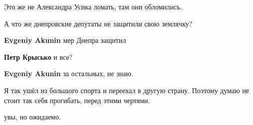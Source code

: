 \begin{itemize}
Это же не Александра Усика ломать, там они обломились.

 
А что же днепровские депутаты не защитили свою землячку?🤔

\begin{itemize}
 
\textbf{Evgeniy Akunin} мер Днепра защитил

 
\textbf{Петр Крысько} и все?

 
\textbf{Evgeniy Akunin} за остальных, не знаю.
\end{itemize}

 
Я так ушёл из большого спорта и переехал в другую страну. Поэтому думаю не стоит так себя прогибать, перед этими чертями.

 
увы, но ожидаемо.

 

\end{itemize}
